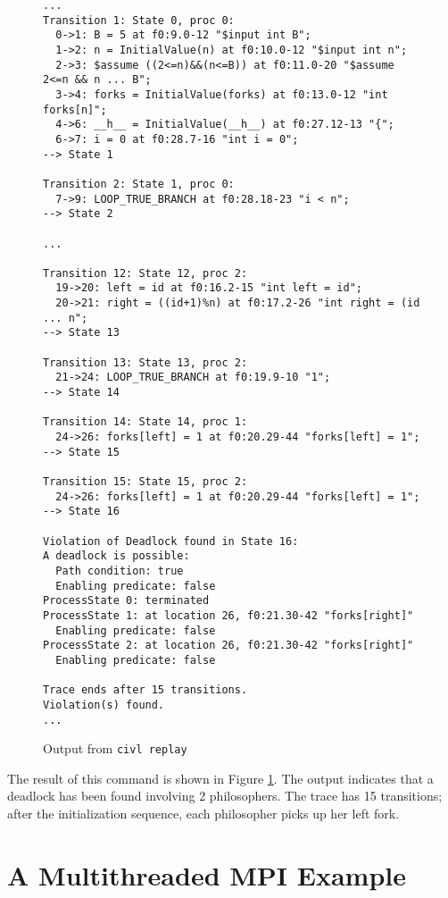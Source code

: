 \begin{figure}
  \begin{small}
\begin{verbatim}
...
Transition 1: State 0, proc 0: 
  0->1: B = 5 at f0:9.0-12 "$input int B";
  1->2: n = InitialValue(n) at f0:10.0-12 "$input int n";
  2->3: $assume ((2<=n)&&(n<=B)) at f0:11.0-20 "$assume 2<=n && n ... B";
  3->4: forks = InitialValue(forks) at f0:13.0-12 "int forks[n]";
  4->6: __h__ = InitialValue(__h__) at f0:27.12-13 "{";
  6->7: i = 0 at f0:28.7-16 "int i = 0";
--> State 1

Transition 2: State 1, proc 0: 
  7->9: LOOP_TRUE_BRANCH at f0:28.18-23 "i < n";
--> State 2

...

Transition 12: State 12, proc 2: 
  19->20: left = id at f0:16.2-15 "int left = id";
  20->21: right = ((id+1)%n) at f0:17.2-26 "int right = (id  ... n";
--> State 13

Transition 13: State 13, proc 2: 
  21->24: LOOP_TRUE_BRANCH at f0:19.9-10 "1";
--> State 14

Transition 14: State 14, proc 1: 
  24->26: forks[left] = 1 at f0:20.29-44 "forks[left] = 1";
--> State 15

Transition 15: State 15, proc 2: 
  24->26: forks[left] = 1 at f0:20.29-44 "forks[left] = 1";
--> State 16

Violation of Deadlock found in State 16:
A deadlock is possible:
  Path condition: true
  Enabling predicate: false
ProcessState 0: terminated
ProcessState 1: at location 26, f0:21.30-42 "forks[right]"
  Enabling predicate: false
ProcessState 2: at location 26, f0:21.30-42 "forks[right]"
  Enabling predicate: false

Trace ends after 15 transitions.
Violation(s) found.
...
\end{verbatim}
  \end{small}
  \caption{Output from \texttt{civl replay}}
  \label{fig:diningReplay}
\end{figure}

The result of this command is shown in Figure \ref{fig:diningReplay}.
The output indicates that a deadlock has been found involving 2
philosophers. The trace has 15 transitions; after the initialization
sequence, each philosopher picks up her left fork.

\section{A Multithreaded MPI Example}

